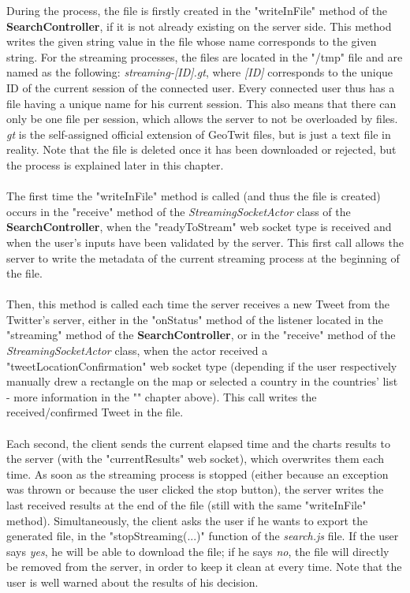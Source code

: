 \documentclass[a4paper,11pt]{report}
\begin{document}
During the process, the file is firstly created in the "writeInFile" method of the \textbf{SearchController}, if it is not already existing on the server side. This method writes the given string value in the file whose name corresponds to the given string. For the streaming processes, the files are located in the "/tmp" file and are named as the following: \emph{streaming-[ID].gt}, where \emph{[ID]} corresponds to the unique ID of the current session of the connected user. Every connected user thus has a file having a unique name for his current session. This also means that there can only be one file per session, which allows the server to not be overloaded by files. \emph{gt} is the self-assigned official extension of GeoTwit files, but is just a text file in reality. Note that the file is deleted once it has been downloaded or rejected, but the process is explained later in this chapter.\\\\
The first time the "writeInFile" method is called (and thus the file is created) occurs in the "receive" method of the \emph{StreamingSocketActor} class of the \textbf{SearchController}, when the "readyToStream" web socket type is received and when the user's inputs have been validated by the server. This first call allows the server to write the metadata of the current streaming process at the beginning of the file.\\\\
Then, this method is called each time the server receives a new Tweet from the Twitter's server, either in the "onStatus" method of the listener located in the "streaming" method of the \textbf{SearchController}, or in the "receive" method of the \emph{StreamingSocketActor} class, when the actor received a "tweetLocationConfirmation" web socket type (depending if the user respectively manually drew a rectangle on the map or selected a country in the countries' list - more information in the "" chapter above). This call writes the received/confirmed Tweet in the file.\\\\
Each second, the client sends the current elapsed time and the charts results to the server (with the "currentResults" web socket), which overwrites them each time. As soon as the streaming process is stopped (either because an exception was thrown or because the user clicked the stop button), the server writes the last received results at the end of the file (still with the same "writeInFile" method). Simultaneously, the client asks the user if he wants to export the generated file, in the "stopStreaming(...)" function of the \emph{search.js} file. If the user says \emph{yes}, he will be able to download the file; if he says \emph{no}, the file will directly be removed from the server, in order to keep it clean at every time. Note that the user is well warned about the results of his decision.
\end{document}

